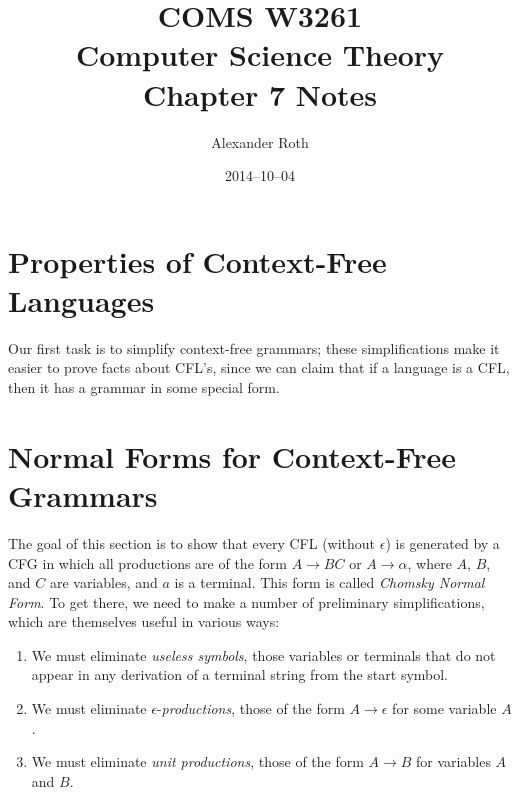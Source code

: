 \documentclass[]{article}
\begin{document}
\title{COMS W3261 \\ Computer Science Theory \\ Chapter 7 Notes}
\author{Alexander Roth}
\date{2014--10--04}
\maketitle
\theoremstyle{definition}
\newtheorem{thm}{Theorem}

\section*{Properties of Context-Free Languages}
  Our first task is to simplify context-free grammars; these simplifications
  make it easier to prove facts about CFL's, since we can claim that if a
  language is a CFL, then it has a grammar in some special form.

\section*{Normal Forms for Context-Free Grammars}
  The goal of this section is to show that every CFL (without $\epsilon$) is
  generated by a CFG in which all productions are of the form $A \rightarrow BC$
  or $A \rightarrow \alpha$, where $A$, $B$, and $C$ are variables, and $a$ is
  a terminal. This form is called \emph{Chomsky Normal Form}. To get there, we
  need to make a number of preliminary simplifications, which are themselves
  useful in various ways:
    \begin{enumerate}
      \item We must eliminate \emph{useless symbols}, those variables or
      terminals
      that do not appear in any derivation of a terminal string from the start
      symbol.
      \item We must eliminate $\epsilon$-\emph{productions}, those of the form
      $A \rightarrow \epsilon$ for some variable $A$.
      \item We must eliminate \emph{unit productions}, those of the form $A
      \rightarrow B$ for variables $A$ and $B$.
    \end{enumerate}
\end{document}
